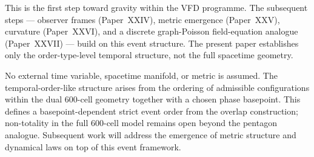 \documentclass[12pt]{article}
\begin{document}
This is the first step toward gravity within the VFD programme. The subsequent steps --- observer frames (Paper~XXIV), metric emergence (Paper~XXV), curvature (Paper~XXVI), and a discrete graph-Poisson field-equation analogue (Paper~XXVII) --- build on this event structure. The present paper establishes only the order-type-level temporal structure, not the full spacetime geometry.

No external time variable, spacetime manifold, or metric is assumed. The temporal-order-like structure arises from the ordering of admissible configurations within the dual 600-cell geometry together with a chosen phase basepoint. This defines a basepoint-dependent strict event order from the overlap construction; non-totality in the full 600-cell model remains open beyond the pentagon analogue. Subsequent work will address the emergence of metric structure and dynamical laws on top of this event framework.



\end{document}
